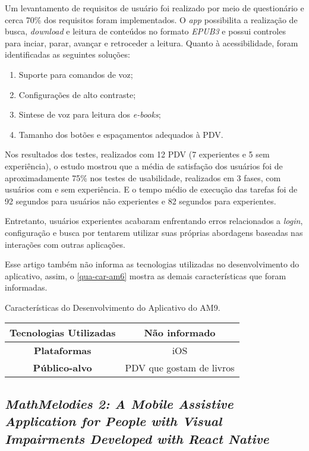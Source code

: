 Um levantamento de requisitos de usuário foi realizado por meio de questionário e cerca 70\% dos requisitos foram implementados.
O \emph{app} possibilita a realização de busca, \emph{download} e leitura de conteúdos no formato \emph{EPUB3} e possui controles para inciar, parar, avançar e retroceder a leitura.
Quanto à acessibilidade, foram identificadas as seguintes soluções:

\begin{enumerate}
  \item Suporte para comandos de voz;
  \item Configurações de alto contraste;
  \item Sintese de voz para leitura dos \emph{e-books};
  \item Tamanho dos botões e espaçamentos adequados à PDV\@.
\end{enumerate}

Nos resultados dos testes, realizados com 12 PDV (7 experientes e 5 sem experiência), o estudo mostrou que a média de satisfação
dos usuários foi de aproximadamente 75\% nos testes de usabilidade, realizados em 3 fases, com usuários com e sem experiência.
E o tempo médio de execução das tarefas foi de 92 segundos para usuários não experientes e 82 segundos para experientes.

Entretanto, usuários experientes acabaram enfrentando erros relacionados a \emph{login}, configuração e busca por tentarem
utilizar suas próprias abordagens baseadas nas interações com outras aplicações.

Esse artigo também não informa as tecnologias utilizadas no desenvolvimento do aplicativo, assim, o \autoref{qua-car-am6}
mostra as demais características que foram informadas.

\begin{quadro}[htb!]
  \caption{\label{qua-car-am9}Características do Desenvolvimento do Aplicativo do AM9.}
  \begin{tabular}{|c|c|}
    \hline
    \textbf{Tecnologias Utilizadas} & Não informado            \\ \hline
    \textbf{Plataformas}            & iOS                      \\ \hline
    \textbf{Público-alvo}           & PDV que gostam de livros \\
    \hline
  \end{tabular}
\end{quadro}

\subsection{\emph{MathMelodies 2: A Mobile Assistive Application for People with Visual Impairments Developed with React Native}}

